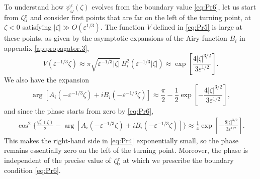\documentclass[final]{siamltex}
\begin{document}
To understand how $\psi_{\omega}^{\varepsilon}(\zeta)$ evolves from the
boundary value \eqref{eq:Pr6}, let us start from $\zeta_{\rm b}^{\varepsilon}$ and
consider first points that are far on the left of the turning point, 
at $\zeta < 0$ satisfying $|\zeta| \gg O({\varepsilon}^{1/3})$. The function $V$
defined in \eqref{eq:Pr5} is large at these points, as given by the
asymptotic expansions of the Airy function $B_i$ in appendix
\ref{ap:propagator.3},
\begin{equation*}
V({\varepsilon}^{-1/3} \zeta) \approx \pi \sqrt{{\varepsilon}^{-1/3} |\zeta|} \,
B_i^2({\varepsilon}^{-1/3}|\zeta|) \approx \exp \left[\frac{4
    |\zeta|^{3/2}}{3 {\varepsilon}^{1/2}}\right].
\end{equation*}
We also have the expansion 
\begin{equation*}
\arg\left[A_i(-{\varepsilon}^{-1/3} \zeta) + i B_i(-{\varepsilon}^{-1/3} \zeta)\right]
\approx \frac{\pi}{2} - \frac{1}{2} \exp \left[-\frac{4
    |\zeta|^{3/2}}{3 {\varepsilon}^{1/2}}\right],
\end{equation*}
and since the phase starts from zero by \eqref{eq:Pr6}, 
\begin{align*}
\cos^2\Big\{ \frac{\psi_{\omega}^{\varepsilon}(\zeta)}{2} - \arg\left[A_i(-{\varepsilon}^{-1/3}
  \zeta) + i B_i(-{\varepsilon}^{-1/3} \zeta)\right]\Big\} \approx 
\frac{1}{4} \exp \left[-\frac{8 |\zeta|^{3/2}}{3 {\varepsilon}^{1/2}}\right].
\end{align*}
This makes the right-hand side in \eqref{eq:Pr4} exponentially small,
so the phase remains essentially zero on the left of the turning
point. Moreover, the phase is independent of the precise value of
$\zeta_{\rm b}^{\varepsilon}$  at which we prescribe the boundary condition
\eqref{eq:Pr6}.
\end{document}

